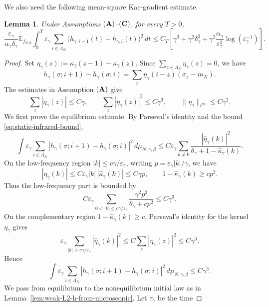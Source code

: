 \documentclass{article}
\newtheorem{lemma}{Lemma}
\begin{document}
We also need the following mean-square Kac-gradient estimate.

\begin{lemma}\label{lem:mean-square-kac-gradient}
Under Assumptions \(({\bf A})\)--\(({\bf C})\), for every \(T>0\),
\begin{equation}\label{eq:kac-gradient-defect-scale}
\frac{\varepsilon_\gamma}{\alpha_\gamma\delta_\gamma}
\mathbb E_{f_{N,0}}
\int_0^T
\varepsilon_\gamma\sum_{i\in\Lambda_N}
\bigl(h_{\gamma,i+1}(t)-h_{\gamma,i}(t)\bigr)^2\,dt
\le
C_T\left[
\gamma^3
+\gamma^2\delta_\gamma^2
+\gamma^2\frac{\alpha_\gamma}{\varepsilon_\gamma^2}
\log(\varepsilon_\gamma^{-1})
\right].
\end{equation}
\end{lemma}

\begin{proof}
Set \(\eta_\gamma(z):=\kappa_\gamma(z-1)-\kappa_\gamma(z).\)
Since \(\sum_{z \in \Lambda_N}\eta_\gamma(z)=0\), we have
\[
h_\gamma(\sigma;i+1)-h_\gamma(\sigma;i)
=\sum_z\eta_\gamma(i-z)(\sigma_z-m_N).
\]
The estimates in Assumption \(({\bf A})\) give
\[
\sum_z|\eta_\gamma(z)|\le C\gamma,\qquad
\sum_z|\eta_\gamma(z)|^2\le C\gamma^3,\qquad
\|\eta_\gamma\|_{\ell^\infty}\le C\gamma^2.
\]
We first prove the equilibrium estimate.  By Parseval's identity and the bound \eqref{eq:static-infrared-bound},
\[
\int \varepsilon_\gamma\sum_{i \in \Lambda_N} |h_\gamma(\sigma;i+1)-h_\gamma(\sigma;i)|^2\,
d\mu_{N,\gamma,\beta}
\le
C\varepsilon_\gamma
\sum_{k\ne0}
\frac{|\widehat\eta_\gamma(k)|^2}
{\theta_\gamma+1-\widehat\kappa_\gamma(k)} .
\]
On the low-frequency region
\(|k|\le c\gamma/\varepsilon_\gamma\), writing
\(p=\varepsilon_\gamma |k|/\gamma\), we have
\[
|\widehat\eta_\gamma(k)|
\le C\varepsilon_\gamma |k|\,|\widehat\kappa_\gamma(k)|
\le C\gamma p,
\qquad
1-\widehat\kappa_\gamma(k)\ge cp^2.
\]
Thus the low-frequency part is bounded by
\[
C\varepsilon_\gamma
\sum_{0<|k|\le c\gamma/\varepsilon_\gamma}
\frac{\gamma^2p^2}{\theta_\gamma+cp^2}
\le C\gamma^3 .
\]
On the complementary region \(1-\widehat\kappa_\gamma(k)\ge c\), Parseval's
identity for the kernel \(\eta_\gamma\) gives
\[
\varepsilon_\gamma
\sum_{|k|>c\gamma/\varepsilon_\gamma}
|\widehat\eta_\gamma(k)|^2
\le
C\sum_z|\eta_\gamma(z)|^2
\le C\gamma^3 .
\]
Hence
\begin{equation}\label{eq:equilibrium-kac-gradient-square}
\int \varepsilon_\gamma\sum_{i \in \Lambda_N} |h_\gamma(\sigma;i+1)-h_\gamma(\sigma;i)|^2\,
d\mu_{N,\gamma,\beta}
\le C\gamma^3 .
\end{equation}
We pass from equilibrium to the nonequilibrium initial law as in Lemma~\ref{lem:weak-L2-h-from-microscopic}.  Let \(\tau_\gamma\) be the time

\end{proof}
\end{document}
